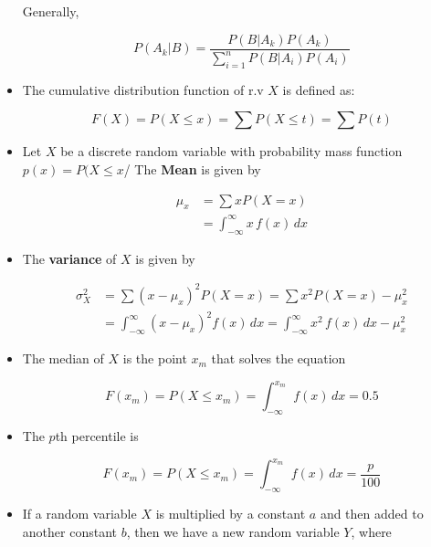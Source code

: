 \documentclass[9pt,landscape]{memoir}
\begin{document}
\begin{multicols}{3}
\begin{itemize}
    Generally,

            \begin{equation*}
                P(A_k|B) = \frac{P(B|A_k)P(A_k)}{\sum_{i = 1} ^n P(B|A_i)P(A_i)}
            \end{equation*}

        \item The cumulative distribution function of r.v $X$ is defined as:

            \begin{equation*}
                F(X) = P(X \leq x) = \sum P(X \leq t) = \sum P(t)
            \end{equation*}

        \item Let $X$ be a discrete random variable with probability mass function $p(x) = P(X \leq x$/ The \textbf{Mean} is given by

            \begin{align*}
                \mu_x &= \sum xP(X = x) \\
                      &= \int _{-\infty} ^{\infty} x\,f(x)\,dx
            \end{align*}

        \item The \textbf{variance} of $X$ is given by

            \begin{align*}
                \sigma^2 _X &= \sum (x - \mu_x)^2 P(X = x) = \sum x^2 P(X = x) - \mu_x^2 \\
                            &= \int _{-\infty} ^{\infty} (x - \mu_x)^2 f(x)\,dx = \int _{-\infty} ^{\infty} x^2\,f(x)\,dx - \mu_x^2
            \end{align*}

        \item The median of $X$ is the point $x_m$ that solves the equation

            \begin{equation*}
                F(x_m) = P(X \leq x_m) = \int _{-\infty} ^{x_m} f(x)\, dx = 0.5
            \end{equation*}

        \item The $p$th percentile is

            \begin{equation*}
                F(x_m) = P(X \leq x_m) = \int _{-\infty} ^{x_m} f(x)\, dx = \frac{p}{100}
            \end{equation*}
        \item If a random variable $X$ is multiplied by a constant $a$ and then added to another constant $b$, then we have a new random variable $Y$, where


\end{itemize}
\end{multicols}
\end{document}
